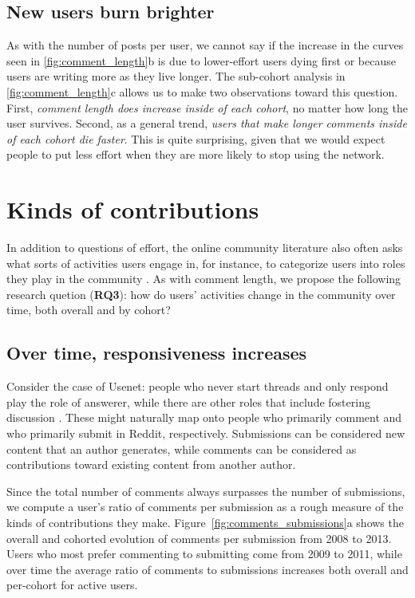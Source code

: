 \subsection{New users burn brighter}
As with the number of posts per user, we cannot say if the increase in the curves seen in \ref{fig:comment_length}b is due to lower-effort users dying first or because users are writing more as they live longer.  The sub-cohort analysis in \ref{fig:comment_length}c allows us to make two observations toward this question.  First, \textit{comment length does increase inside of each cohort}, no matter how long the user survives.  Second, as a general trend, \textit{users that make longer comments inside of each cohort die faster}. This is quite surprising, given that we would expect people to put less effort when they are more likely to stop using the network.

\section{Kinds of contributions}

In addition to questions of effort, the online community literature also often asks what sorts of activities users engage in, for instance, to categorize users into roles they play in the community \cite{Welser2011}. As with comment length, we propose the following research quetion (\textbf{RQ3}): how do users' activities change in the community over time, both overall and by cohort?

\subsection{Over time, responsiveness increases}
Consider the case of Usenet: people who never start threads and only respond play the role of answerer, while there are other roles that include fostering discussion \cite{Welser2007}.  These might naturally map onto people who primarily comment and who primarily submit in Reddit, respectively.  Submissions can be considered new content that an author generates, while comments can be considered as contributions toward existing content from another author.

Since the total number of comments always surpasses the number of submissions, we compute a user's ratio of comments per submission as a rough measure of the kinds of contributions they make.  Figure~\ref{fig:comments_submissions}a shows the overall and cohorted evolution of comments per submission from 2008 to 2013.  Users who most prefer commenting to submitting come from 2009 to 2011, while over time the average ratio of comments to submissions increases both overall and per-cohort for active users.

